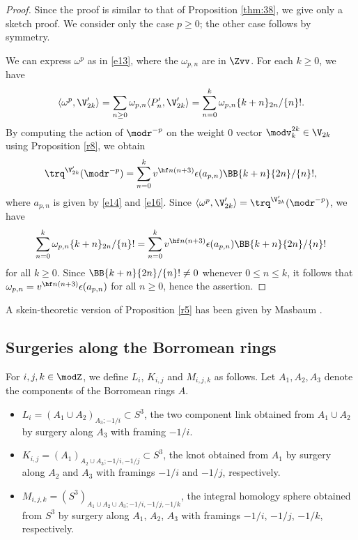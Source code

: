 \documentclass{amsart}
\numberwithin{equation}{section}
\numberwithin{figure}{section}
\theoremstyle{plain}
\theoremstyle{definition}
\theoremstyle{remark}
\begin{document}
\begin{proof}
  Since the proof is similar to that of Proposition \ref{thm:38}, we
  give only a sketch proof.  We consider only the case $p\ge 0$; the
  other case follows by symmetry.

  We can express $\omega ^p$ as in \eqref{e13}, where the $\omega _{p,n}$ are in
  $\Zvv$.  For each $k\ge 0$, we have
  \begin{equation*}
    \begin{split}
      \langle \omega ^p,\V'_{2k}\rangle 
      =\sum_{n\ge 0}\omega _{p,n}\langle P'_n,\V'_{2k}\rangle 
      =\sum_{n=0}^k \omega _{p,n}\{k+n\}_{2n}/\{n\}!.
    \end{split}
  \end{equation*}
  By computing the action of $\modr ^{-p}$ on the weight $0$ vector
  $\modv ^{2k}_k\in \V_{2k}$ using Proposition \ref{r8}, we obtain
  \begin{equation*}
    \trq^{\V'_{2k}}(\modr ^{-p})
    =\sum_{n=0}^k v^{\hf n(n+3)}\epsilon (a_{p,n})\BB{k+n}{2n}/\{n\}!,
  \end{equation*}
  where $a_{p,n}$ is given by \eqref{e14} and \eqref{e16}.  Since
  $\langle \omega ^p,\V'_{2k}\rangle =\trq^{\V'_{2k}}(\modr ^{-p})$, we have
  \begin{equation*}
    \sum_{n=0}^k \omega _{p,n}\{k+n\}_{2n}/\{n\}!
    =\sum_{n=0}^k v^{\hf n(n+3)}\epsilon (a_{p,n})\BB{k+n}{2n}/\{n\}!
  \end{equation*}
  for all $k\ge 0$.  Since $\BB{k+n}{2n}/\{n\}!\neq0$ whenever
  $0\le n\le k$, it follows that $\omega _{p,n}=v^{\hf n(n+3)}\epsilon (a_{p,n})$
  for all $n\ge 0$, hence the assertion.
\end{proof}

A skein-theoretic version of Proposition \ref{r5} has been given by
Masbaum \cite{Masbaum}.

\subsection{Surgeries along the Borromean rings}
\label{sec:surg-borr-rings}

For $i,j,k\in \modZ $, we define $L_i$, $K_{i,j}$ and $M_{i,j,k}$ as
follows.  Let $A_1,A_2,A_3$ denote the components of the Borromean
rings $A$.
\begin{itemize}
\item $L_i=(A_1\cup A_2)_{A_3;-1/i}\subset S^3$, the two component link
 obtained from $A_1\cup A_2$ by surgery along $A_3$ with framing $-1/i$.
\item $K_{i,j}=(A_1)_{A_2\cup A_3;-1/i,-1/j}\subset S^3$, the knot obtained
from $A_1$ by surgery along $A_2$ and $A_3$ with framings $-1/i$ and
$-1/j$, respectively.
\item $M_{i,j,k}=(S^3)_{A_1\cup A_2\cup A_3;-1/i,-1/j,-1/k}$, the integral
homology sphere obtained from $S^3$ by surgery along $A_1$, $A_2$,
$A_3$ with framings $-1/i$, $-1/j$, $-1/k$, respectively.
\end{itemize}
\end{document}
